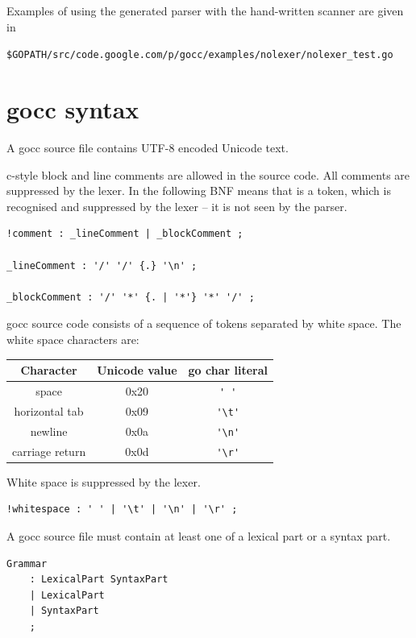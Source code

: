 \documentclass[12pt]{article}
\begin{document}
    

    Examples of using the generated parser with the hand-written scanner are given in 

    \verb|$GOPATH/src/code.google.com/p/gocc/examples/nolexer/nolexer_test.go|

\section{gocc syntax}\label{sec:gocc syntax}
	A gocc source file contains UTF-8 encoded Unicode text.

	c-style block and line comments are allowed in the source code. All comments are suppressed by the lexer.
	In the following BNF  means that  is a token, which is recognised and suppressed by the lexer -- it is not seen by the parser.

	\begin{Verbatim}[frame=single]
!comment : _lineComment | _blockComment ;

_lineComment : '/' '/' {.} '\n' ;

_blockComment : '/' '*' {. | '*'} '*' '/' ;
	\end{Verbatim}

	gocc source code consists of a sequence of tokens separated by white space. The white space characters are:

	\begin{tabular}{ccc}
		\bf Character & \bf Unicode value & \bf go char literal\\
		\hline
		space	& 0x20 & \verb|' '| \\
		horizontal tab & 0x09 & \verb|'\t'| \\
		newline & 0x0a & \verb|'\n'| \\
		carriage return & 0x0d & \verb|'\r'| \\
	\end{tabular}

	White space is suppressed by the lexer.

	\begin{Verbatim}[frame=single]
!whitespace : ' ' | '\t' | '\n' | '\r' ;
	\end{Verbatim}



	A gocc source file must contain at least one of a lexical part or a syntax part.

	\begin{Verbatim}[frame=single]
Grammar 
    : LexicalPart SyntaxPart
    | LexicalPart
    | SyntaxPart
    ;
\end{Verbatim}
\end{document}
